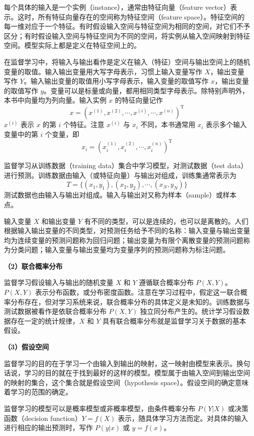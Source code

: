 \documentclass[UTF8, 12pt, fontset=fandol, oneside]{ctexart}
\begin{document}
每个具体的输入是一个实例（instance），通常由特征向量（feature vector）表示。这时，所有特征向量存在的空间称为特征空间（feature space）。特征空间的每一维对应于一个特征。有时假设输入空间与特征空间为相同的空间，对它们不予区分；有时假设输入空间与特征空间为不同的空间，将实例从输入空间映射到特征空间。模型实际上都是定义在特征空间上的。

在监督学习中，将输入与输出看作是定义在输入（特征）空间与输出空间上的随机变量的取值。输入输出变量用大写字母表示，习惯上输入变量写作 $X$，输出变量写作 $Y$。输入输出变量的取值用小写字母表示，输入变量的取值写作 $x$，输出变量的取值写作 $y$。变量可以是标量或向量，都用相同类型字母表示。除特别声明外，本书中向量均为列向量。输入实例 $x$ 的特征向量记作
\[
  x=\left(x^{(1)},x^{(2)},\cdots,x^{(i)},\cdots,x^{(n)}\right)^{\mathrm T}
\]
$x^{(i)}$ 表示 $x$ 的第 $i$ 个特征。注意 $x^{(i)}$ 与 $x_i$ 不同，本书通常用 $x_i$ 表示多个输入变量中的第 $i$ 个变量，即
\[
  x_i=\left(x_i^{(1)},x_i^{(2)},\cdots,x_i^{(n)}\right)^{\mathrm T}
\]

监督学习从训练数据（training data）集合中学习模型，对测试数据（test data）进行预测。训练数据由输入（或特征向量）与输出对组成，训练集通常表示为
\[
  T=\{(x_1,y_1),(x_2,y_2),\cdots,(x_N,y_N)\}
\]
测试数据也由输入与输出对组成。输入与输出对又称为样本（sample）或样本点。

输入变量 $X$ 和输出变量 $Y$ 有不同的类型，可以是连续的，也可以是离散的。人们根据输入输出变量的不同类型，对预测任务给予不同的名称：输入变量与输出变量均为连续变量的预测问题称为回归问题；输出变量为有限个离散变量的预测问题称为分类问题；输入变量与输出变量均为变量序列的预测问题称为标注问题。

\noindent\textbf{（2）联合概率分布}

监督学习假设输入与输出的随机变量 $X$ 和 $Y$ 遵循联合概率分布 $P(X,Y)$。$P(X,Y)$ 表示分布函数，或分布密度函数。注意在学习过程中，假定这一联合概率分布存在，但对学习系统来说，联合概率分布的具体定义是未知的。训练数据与测试数据被看作是依联合概率分布 $P(X,Y)$ 独立同分布产生的。统计学习假设数据存在一定的统计规律，$X$ 和 $Y$ 具有联合概率分布就是监督学习关于数据的基本假设。

\noindent\textbf{（3）假设空间}

监督学习的目的在于学习一个由输入到输出的映射，这一映射由模型来表示。换句话说，学习的目的就在于找到最好的这样的模型。模型属于由输入空间到输出空间的映射的集合，这个集合就是假设空间（hypothesis space）。假设空间的确定意味着学习的范围的确定。

监督学习的模型可以是概率模型或非概率模型，由条件概率分布 $P(Y|X)$ 或决策函数（decision function）$Y=f(X)$ 表示，随具体学习方法而定。对具体的输入进行相应的输出预测时，写作 $P(y|x)$ 或 $y=f(x)$。
\end{document}
